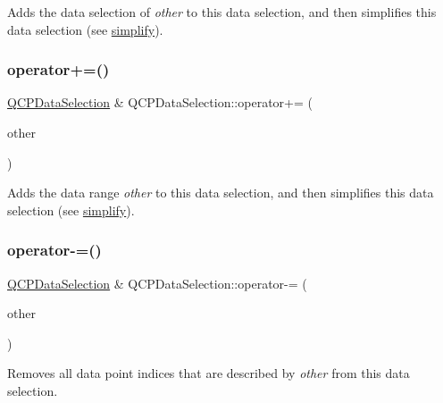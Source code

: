Adds the data selection of {\itshape other} to this data selection, and then simplifies this data selection (see \hyperlink{class_q_c_p_data_selection_a4a2fbad1a6e4d1dd26fdfdf88956f2a4}{simplify}). \mbox{\label{class_q_c_p_data_selection_a17058640d4e6f49984a0e7e42043df1b}} 
\subsubsection{\texorpdfstring{operator+=()}{operator+=()}\hspace{0.1cm}{\footnotesize\ttfamily [2/2]}}
{\footnotesize\ttfamily \hyperlink{class_q_c_p_data_selection}{Q\+C\+P\+Data\+Selection} \& Q\+C\+P\+Data\+Selection\+::operator+= (\begin{DoxyParamCaption}\item[{const \hyperlink{class_q_c_p_data_range}{Q\+C\+P\+Data\+Range} \&}]{other }\end{DoxyParamCaption})}

Adds the data range {\itshape other} to this data selection, and then simplifies this data selection (see \hyperlink{class_q_c_p_data_selection_a4a2fbad1a6e4d1dd26fdfdf88956f2a4}{simplify}). \mbox{\label{class_q_c_p_data_selection_a66f9fab70b026baa64bf8e52fe5de07e}} 
\subsubsection{\texorpdfstring{operator-\/=()}{operator-=()}\hspace{0.1cm}{\footnotesize\ttfamily [1/2]}}
{\footnotesize\ttfamily \hyperlink{class_q_c_p_data_selection}{Q\+C\+P\+Data\+Selection} \& Q\+C\+P\+Data\+Selection\+::operator-\/= (\begin{DoxyParamCaption}\item[{const \hyperlink{class_q_c_p_data_selection}{Q\+C\+P\+Data\+Selection} \&}]{other }\end{DoxyParamCaption})}

Removes all data point indices that are described by {\itshape other} from this data selection. \mbox{\label{class_q_c_p_data_selection_a8d18b20d20dde737eefc10967e31cf73}} 
